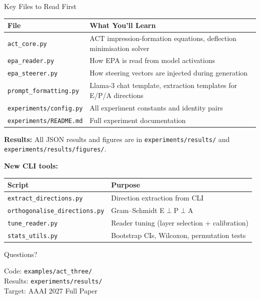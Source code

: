 \documentclass[aspectratio=169,11pt]{beamer}
\begin{document}
\begin{frame}{Key Files to Read First}

\begin{tabular}{lp{8cm}}
\toprule
\textbf{File} & \textbf{What You'll Learn} \\
\midrule
\texttt{act\_core.py} & ACT impression-formation equations,
    deflection minimisation solver \\
\texttt{epa\_reader.py} & How EPA is read from model activations \\
\texttt{epa\_steerer.py} & How steering vectors are injected during
    generation \\
\texttt{prompt\_formatting.py} & Llama-3 chat template, extraction
    templates for E/P/A directions \\
\texttt{experiments/config.py} & All experiment constants and identity
    pairs \\
\texttt{experiments/README.md} & Full experiment documentation \\
\bottomrule
\end{tabular}

\bigskip

\textbf{Results:} All JSON results and figures are in
\texttt{experiments/results/} and \texttt{experiments/results/figures/}.

\bigskip

\textbf{New CLI tools:}
\begin{tabular}{lp{6cm}}
\toprule
\textbf{Script} & \textbf{Purpose} \\
\midrule
\texttt{extract\_directions.py} & Direction extraction from CLI \\
\texttt{orthogonalise\_directions.py} & Gram--Schmidt E$\perp$P$\perp$A \\
\texttt{tune\_reader.py} & Reader tuning (layer selection + calibration) \\
\texttt{stats\_utils.py} & Bootstrap CIs, Wilcoxon, permutation tests \\
\bottomrule
\end{tabular}
\end{frame}

\begin{frame}[standout]
    Questions?

    \bigskip

    \small
    Code: \texttt{examples/act\_three/}\\
    Results: \texttt{experiments/results/}\\
    Target: AAAI 2027 Full Paper
\end{frame}
\end{document}
